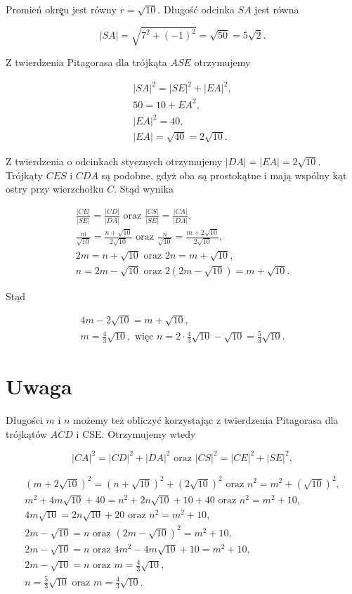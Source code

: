 \documentclass[10pt]{article}
\begin{document}
Promień okrę̨u jest równy $r=\sqrt{10}$. Długość odcinka $S A$ jest równa

$$
|S A|=\sqrt{7^{2}+(-1)^{2}}=\sqrt{50}=5 \sqrt{2} .
$$

Z twierdzenia Pitagorasa dla trójkąta $A S E$ otrzymujemy

$$
\begin{gathered}
|S A|^{2}=|S E|^{2}+|E A|^{2}, \\
50=10+E A^{2}, \\
|E A|^{2}=40, \\
|E A|=\sqrt{40}=2 \sqrt{10} .
\end{gathered}
$$

Z twierdzenia o odcinkach stycznych otrzymujemy $|D A|=|E A|=2 \sqrt{10}$.\\
Trójkąty $C E S$ i $C D A$ są podobne, gdyż oba są prostokątne i mają wspólny kąt ostry przy wierzchołku $C$. Stąd wynika

$$
\begin{gathered}
\frac{|C E|}{|S E|}=\frac{|C D|}{|D A|} \text { oraz } \frac{|C S|}{|S E|}=\frac{|C A|}{|D A|}, \\
\frac{m}{\sqrt{10}}=\frac{n+\sqrt{10}}{2 \sqrt{10}} \text { oraz } \frac{n}{\sqrt{10}}=\frac{m+2 \sqrt{10}}{2 \sqrt{10}}, \\
2 m=n+\sqrt{10} \text { oraz } 2 n=m+\sqrt{10}, \\
n=2 m-\sqrt{10} \text { oraz } 2(2 m-\sqrt{10})=m+\sqrt{10} .
\end{gathered}
$$

Stąd

$$
\begin{gathered}
4 m-2 \sqrt{10}=m+\sqrt{10}, \\
m=\frac{4}{3} \sqrt{10}, \text { więc } n=2 \cdot \frac{4}{3} \sqrt{10}-\sqrt{10}=\frac{5}{3} \sqrt{10} .
\end{gathered}
$$

\section*{Uwaga}
Długości $m$ i $n$ możemy też obliczyć korzystając z twierdzenia Pitagorasa dla trójkątów $A C D$ i CSE. Otrzymujemy wtedy

$$
|C A|^{2}=|C D|^{2}+|D A|^{2} \text { oraz }|C S|^{2}=|C E|^{2}+|S E|^{2},
$$

$$
\begin{gathered}
(m+2 \sqrt{10})^{2}=(n+\sqrt{10})^{2}+(2 \sqrt{10})^{2} \text { oraz } n^{2}=m^{2}+(\sqrt{10})^{2}, \\
m^{2}+4 m \sqrt{10}+40=n^{2}+2 n \sqrt{10}+10+40 \text { oraz } n^{2}=m^{2}+10, \\
4 m \sqrt{10}=2 n \sqrt{10}+20 \text { oraz } n^{2}=m^{2}+10, \\
2 m-\sqrt{10}=n \text { oraz }(2 m-\sqrt{10})^{2}=m^{2}+10, \\
2 m-\sqrt{10}=n \text { oraz } 4 m^{2}-4 m \sqrt{10}+10=m^{2}+10, \\
2 m-\sqrt{10}=n \text { oraz } m=\frac{4}{3} \sqrt{10}, \\
n=\frac{5}{3} \sqrt{10} \text { oraz } m=\frac{4}{3} \sqrt{10} .
\end{gathered}
$$
\end{document}
